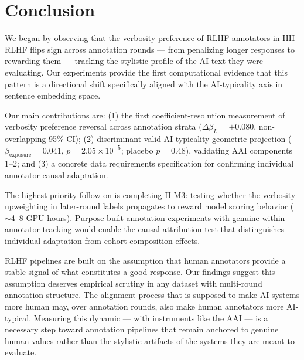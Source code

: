 \section{Conclusion}
\label{sec:conclusion}

We began by observing that the verbosity preference of RLHF annotators in HH-RLHF flips sign across annotation rounds --- from penalizing longer responses to rewarding them --- tracking the stylistic profile of the AI text they were evaluating. Our experiments provide the first computational evidence that this pattern is a directional shift specifically aligned with the AI-typicality axis in sentence embedding space.

Our main contributions are: (1) the first coefficient-resolution measurement of verbosity preference reversal across annotation strata ($\Delta\beta_L = +0.080$, non-overlapping 95\% CI); (2) discriminant-valid AI-typicality geometric projection ($\beta_\text{exposure} = 0.041$, $p = 2.05\times10^{-5}$; placebo $p = 0.48$), validating AAI components 1--2; and (3) a concrete data requirements specification for confirming individual annotator causal adaptation.

The highest-priority follow-on is completing H-M3: testing whether the verbosity upweighting in later-round labels propagates to reward model scoring behavior ($\sim$4--8 GPU hours). Purpose-built annotation experiments with genuine within-annotator tracking would enable the causal attribution test that distinguishes individual adaptation from cohort composition effects.

RLHF pipelines are built on the assumption that human annotators provide a stable signal of what constitutes a good response. Our findings suggest this assumption deserves empirical scrutiny in any dataset with multi-round annotation structure. The alignment process that is supposed to make AI systems more human may, over annotation rounds, also make human annotators more AI-typical. Measuring this dynamic --- with instruments like the AAI --- is a necessary step toward annotation pipelines that remain anchored to genuine human values rather than the stylistic artifacts of the systems they are meant to evaluate.
